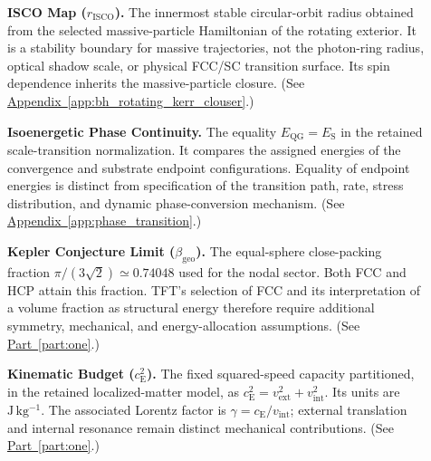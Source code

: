 \begin{description}
\item[] \begin{minipage}[t]{\linewidth}
\textbf{ISCO Map ($r_{\mathrm{ISCO}}$).} The innermost stable circular-orbit radius obtained from the selected massive-particle Hamiltonian of the rotating exterior. It is a stability boundary for massive trajectories, not the photon-ring radius, optical shadow scale, or physical FCC/SC transition surface. Its spin dependence inherits the massive-particle closure.
(See \hyperref[app:bh_rotating_kerr_clouser]{Appendix~\ref*{app:bh_rotating_kerr_clouser}}.)
\end{minipage}

\item[] \begin{minipage}[t]{\linewidth}
\textbf{Isoenergetic Phase Continuity.} The equality $E_{\mathrm{QG}}=E_{\mathrm S}$ in the retained scale-transition normalization. It compares the assigned energies of the convergence and substrate endpoint configurations. Equality of endpoint energies is distinct from specification of the transition path, rate, stress distribution, and dynamic phase-conversion mechanism.
(See \hyperref[app:phase_transition]{Appendix~\ref*{app:phase_transition}}.)
\end{minipage}

\item[] \begin{minipage}[t]{\linewidth}
\textbf{Kepler Conjecture Limit ($\beta_{\mathrm{geo}}$).} The equal-sphere close-packing fraction $\pi/(3\sqrt2)\simeq0.74048$ used for the nodal sector. Both FCC and HCP attain this fraction. TFT's selection of FCC and its interpretation of a volume fraction as structural energy therefore require additional symmetry, mechanical, and energy-allocation assumptions.
(See \hyperref[part:one]{Part~\ref*{part:one}}.)
\end{minipage}

\item[] \begin{minipage}[t]{\linewidth}
\textbf{Kinematic Budget ($c_{\mathrm E}^2$).} The fixed squared-speed capacity partitioned, in the retained localized-matter model, as $c_{\mathrm E}^2=v_{\mathrm{ext}}^2+v_{\mathrm{int}}^2$. Its units are $\mathrm{J\,kg^{-1}}$. The associated Lorentz factor is $\gamma=c_{\mathrm E}/v_{\mathrm{int}}$; external translation and internal resonance remain distinct mechanical contributions.
(See \hyperref[part:one]{Part~\ref*{part:one}}.)
\end{minipage}


\end{description}
